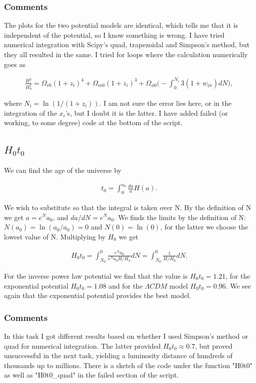 \documentclass[a4paper,10pt]{article}
\begin{document}
\subsubsection{Comments} The plots for the two potential models are identical, which tells me that it is independent of the potential, so I know something is wrong. I have tried numerical integration with Scipy's quad, trapezoidal and Simpson's method, but they all resulted in the same. I tried for loops where the calculation numerically goes as

\begin{align}
\frac{H^2}{H_0^2} = \Omega_{r0}(1+z_i)^4 + \Omega_{m0}(1+z_i)^3 + \Omega_{\phi 0}\bigg(-\int_0^{N_i}3(1+w_{\phi i})dN\bigg),
\end{align}

where $N_i = \ln(1/(1+z_i))$. I am not sure the error lies here, or in the integration of the $x_i$'s, but I doubt it is the latter. I have added failed (or working, to some degree) code at the bottom of the script. 


\subsection{$H_0t_0$}
We can find the age of the universe by

\begin{align}
t_0 = \int_0^{a_0} \frac{da}{a}H(a).
\end{align}

We wish to substitute so that the integral is taken over N. By the definition of N we get $a = e^Na_0$, and $da/dN = e^Na_0$. We finds the limits by the definition of N: $N(a_0) = \ln(a_0/a_0) = 0$ and $N(0) = \ln(0)$, for the latter we choose the lowest value of N. Multiplying by $H_0$ we get

\begin{align}
H_0t_0 = \int_{N_0}^0 \frac{e^Na_0}{e^Na_0 H/H_0}dN = \int_{N_0}^0 \frac{1}{H/H_0} dN.
\end{align}

For the inverse power law potential we find that the value is $H_0t_0 = 1.21$, for the exponential potential $H_0t_0 = 1.08$ and for the $\Lambda CDM$ model $H_0t_0 = 0.96$. We see again that the exponential potential provides the best model.

\subsubsection{Comments}
In this task I got different results based on whether I used Simpson's method or quad for numerical integration. The latter provided $H_0t_0 \approx 0.7$, but proved unsuccessful in the next task, yielding a luminosity distance of hundreds of thousands up to millions. There is a sketch of the code under the function "H0t0" as well as "H0t0\_quad" in the failed section of the script.
\end{document}
